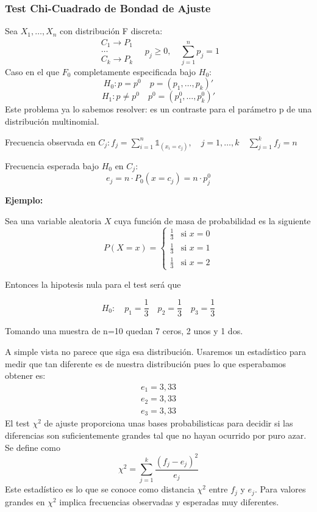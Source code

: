 \subsubsection{Test Chi-Cuadrado de Bondad de Ajuste}

Sea $X_1,\dots,X_n$ con distribución F discreta:
\[
    \begin{matrix}
        C_1 \to P_1\\
        \dots \\
        C_k \to P_k
    \end{matrix}
    \quad
    p_j \geq 0,
    \quad \sum_{j=1}^{n} p_j=1
\]
Caso en el que $F_0$ completamente especificada bajo $H_0$:
\[
    H_0: p=p^0 \quad p=(p_1,\dots,p_k)'
\]
\[
    H_1: p \neq p^0 \quad p^0=(p_1^0,\dots,p_k^0)'
\]
Este problema ya lo sabemos resolver: es un contraste para el parámetro p de una distribución multinomial.

Frecuencia observada en $C_j: f_j=\sum_{i=1}^{n} \mathbb{1}_{(x_i=c_j)}, \quad j=1,\dots,k \quad \sum_{j=1}^{k} f_j=n$

Frecuencia esperada bajo $H_0$ en $C_j$:
\[
    e_j=n \cdot P_0(x=c_j)=n \cdot p_j^0
\]

\newpage

\textbf{Ejemplo:}

Sea una variable aleatoria $X$ cuya función de masa de probabilidad es la siguiente
\[
    P(X = x) = 
    \left\{
        \begin{matrix}
            \frac{1}{3} & \text{si } x = 0 \\[0.5em]
            \frac{1}{3} & \text{si } x = 1 \\[0.5em]
            \frac{1}{3} & \text{si } x = 2
        \end{matrix}
    \right.
\]

Entonces la hipotesis nula para el test será que

\[
    H_0:\quad p_1=\frac{1}{3} \quad p_2=\frac{1}{3} \quad p_3=\frac{1}{3}
\]

Tomando una muestra de n=10 quedan 7 ceros, 2 unos y 1 dos.

\vspace{5mm}

A simple vista no parece que siga esa distribución. Usaremos un estadístico para medir que tan diferente es de nuestra distribución pues lo que esperabamos obtener es:
\[
    \begin{matrix}
        e_1=3,33\\
        e_2=3,33\\
        e_3=3,33
    \end{matrix}
\]
El test $\chi^2$ de ajuste proporciona unas bases probabilisticas para decidir si las diferencias son suficientemente grandes tal que no hayan ocurrido por puro azar. Se define como
\[
    \chi^2=\sum_{j=1}^{k} \frac{(f_j-e_j)^2}{e_j}
\]
Este estadístico es lo que se conoce como distancia $\chi^2$ entre $f_j$ y $e_j$. Para valores grandes en $\chi^2$ implica frecuencias observadas y esperadas muy diferentes. 

